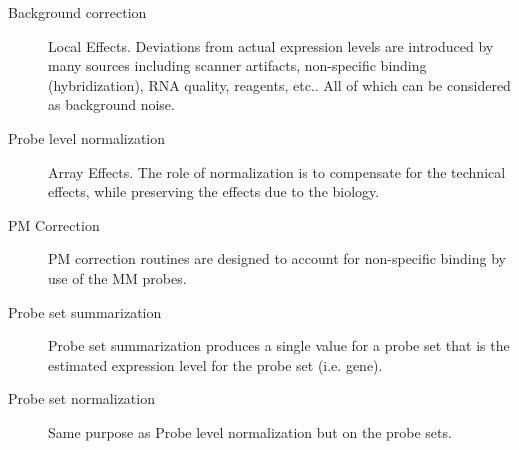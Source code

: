 \documentclass[pdf]{beamer}
\begin{document}
\begin{frame}
  \begin{description}
    \item[Background correction] Local Effects. Deviations from actual expression levels are introduced by many sources including scanner artifacts, non-specific binding (hybridization), RNA quality, reagents, etc.. All of which can be considered as background noise.
    \item[Probe level normalization] Array Effects. The role of normalization is to compensate for the technical effects, while preserving the effects due to the biology.
    \item[PM Correction] PM correction routines are designed to account for non-specific binding by use of the MM probes.
    \item[Probe set summarization] Probe set summarization produces a single value for a probe set that is the estimated expression level for the probe set (i.e. gene).
    \item[Probe set normalization] Same purpose as Probe level normalization but on the probe sets.
  \end{description}
\end{frame}
\end{document}
